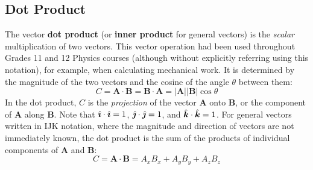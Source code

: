 \documentclass{../../oss-handout}
\newcommand{\iii}{\ensuremath\hat{\bm{\imath}}}
\newcommand{\jjj}{\ensuremath\hat{\bm{\jmath}}}
\newcommand{\kkk}{\ensuremath\hat{\bm{k}}}
\begin{document}
\subsection{Dot Product}
The vector \textbf{dot product} (or \textbf{inner product} for general vectors)
is the \emph{scalar} multiplication of two vectors. This vector operation had
been used throughout Grades 11 and 12 Physics courses (although without
explicitly referring using this notation), for example, when calculating
mechanical work. It is determined by the magnitude of the two vectors and the
cosine of the angle $\theta$ between them:
\begin{equation*}
  C=\bm{A}\cdot\bm{B}=\bm{B}\cdot\bm{A}=|\bm{A}||\bm{B}|\cos\theta
\end{equation*}
In the dot product, $C$ is the \emph{projection} of the vector $\bm{A}$ onto
$\bm{B}$, or the component of $\bm{A}$ along $\bm{B}$. Note that
$\iii\cdot\iii=1$, $\jjj\cdot\jjj=1$, and $\kkk\cdot\kkk=1$. For general
vectors written in IJK notation, where the magnitude and direction of vectors
are not immediately known, the dot product is the sum of the products of
individual components of $\bm{A}$ and $\bm{B}$:
\begin{equation*}
  C=\bm{A}\cdot\bm{B}=A_xB_x+A_yB_y+A_zB_z
\end{equation*}
\end{document}

